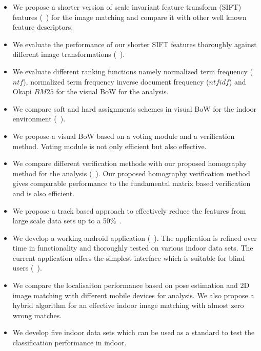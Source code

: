 \begin{itemize}
\item We propose a shorter version of scale invariant feature 
transform (SIFT) features (~\cite{khan12b}) 
for the image matching and compare it with other well known feature 
descriptors.

\item We evaluate the performance of our 
shorter SIFT features thoroughly against 
different image transformations (~\cite{khan11b}). 

\item We evaluate different ranking functions 
namely normalized term frequency ($ntf$), normalized term 
frequency inverse document frequency ($ntfidf$) and 
Okapi $BM25$ for the visual BoW for the analysis. 

\item We compare soft and hard 
assignments schemes  in visual BoW 
for the indoor environment (~\cite{khan11a}). 


\item We propose a visual BoW based on 
a voting module and a verification method. Voting module 
is not only efficient but also effective.


\item We compare different verification methods 
with our proposed homography method for the analysis (~\cite{khan11a}).
Our proposed homography verification method 
gives comparable performance to the fundamental 
matrix based verification and is also efficient. 

\item We propose a track based approach to 
effectively reduce the features from large scale data sets 
up to a 50\%~\cite{khan12c}.


\item We develop a working android application (~\cite{khan12a}). 
The application is refined over time 
in functionality and thoroughly tested on various 
indoor data sets. The current application offers the 
simplest interface which is suitable for blind users (~\cite{khan12b}). 


\item We compare the localisaiton performance 
based on pose estimation and 2D image matching 
with different mobile devices for analysis.
We also propose a hybrid algorithm 
for an effective indoor image matching 
with almost zero wrong matches. 

\item We develop five indoor data sets which 
can be used as a standard to test the classification 
performance in indoor. 
\end{itemize}


